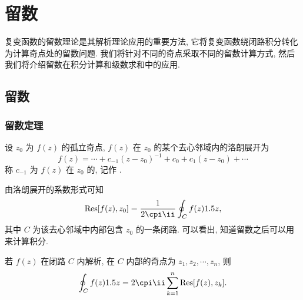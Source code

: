 \chapter{留数}
\label{chapter:5}

复变函数的留数理论是其解析理论应用的重要方法, 它将复变函数绕闭路积分转化为计算奇点处的留数问题.
我们将针对不同的奇点采取不同的留数计算方式, 然后我们将介绍留数在积分计算和级数求和中的应用.



\section{留数}

\subsection{留数定理}

\begin{definition}
  设 $z_0$ 为 $f(z)$ 的孤立奇点, $f(z)$ 在 $z_0$ 的某个去心邻域内的洛朗展开为
  \[
    f(z)=\cdots+c_{-1}(z-z_0)^{-1}+c_0+c_1(z-z_0)+\cdots
  \]
  称 $c_{-1}$ 为 $f(z)$ 在 $z_0$ 的, 记作 \noun{$\Res[f(z),z_0]$}.
\end{definition}

由洛朗展开的系数形式可知
\[
   \Res[f(z),z_0]
  =\frac1{2\cpi\ii}\oint_Cf(z)\d z,
\]
其中 $C$ 为该去心邻域中内部包含 $z_0$ 的一条闭路.
可以看出, 知道留数之后可以用来计算积分.

\begin{theorem}
  \label{thm:residue}
  若 $f(z)$ 在闭路 $C$ 内解析, 在 $C$ 内部的奇点为 $z_1,z_2,\cdots,z_n$, 则
  \[
     \oint_Cf(z)\d z
    =2\cpi\ii\sum_{k=1}^n\Res[f(z),z_k].
  \]
\end{theorem}

